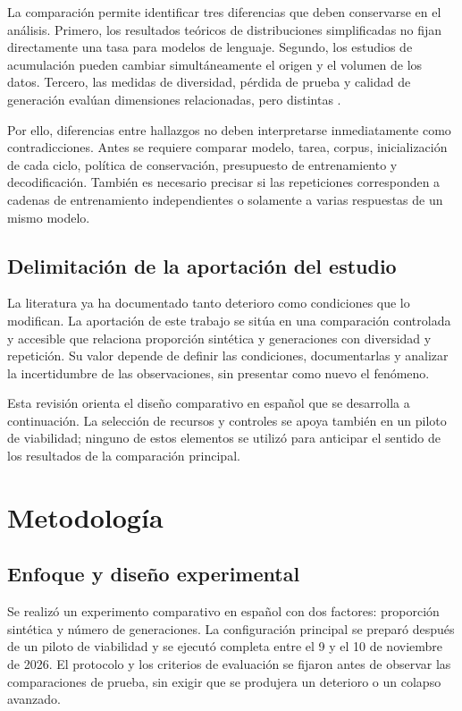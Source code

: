 \documentclass[12pt,letterpaper]{article}
\begin{document}
La comparación permite identificar tres diferencias que deben conservarse
en el análisis. Primero, los resultados teóricos de distribuciones
simplificadas no fijan directamente una tasa para modelos de lenguaje.
Segundo, los estudios de acumulación pueden cambiar simultáneamente el
origen y el volumen de los datos. Tercero, las medidas de diversidad,
pérdida de prueba y calidad de generación evalúan dimensiones relacionadas,
pero distintas \cite{suresh2025,kazdan2025,guo2024,drayson2025}.

Por ello, diferencias entre hallazgos no deben interpretarse inmediatamente
como contradicciones. Antes se requiere comparar modelo, tarea, corpus,
inicialización de cada ciclo, política de conservación, presupuesto de
entrenamiento y decodificación. También es necesario precisar si las
repeticiones corresponden a cadenas de entrenamiento independientes o
solamente a varias respuestas de un mismo modelo.

\subsection{Delimitación de la aportación del estudio}

La literatura ya ha documentado tanto deterioro como condiciones que lo
modifican. La aportación de este trabajo se sitúa en una comparación
controlada y accesible que relaciona proporción sintética y generaciones
con diversidad y repetición. Su valor depende de definir las condiciones,
documentarlas y analizar la incertidumbre de las observaciones, sin
presentar como nuevo el fenómeno.

Esta revisión orienta el diseño comparativo en español que se desarrolla
a continuación. La selección de recursos y controles se apoya también en
un piloto de viabilidad; ninguno de estos elementos se utilizó para
anticipar el sentido de los resultados de la comparación principal.

\section{Metodología}

\subsection{Enfoque y diseño experimental}

Se realizó un experimento comparativo en español con dos factores:
proporción sintética y número de generaciones. La configuración principal
se preparó después de un piloto de viabilidad y se ejecutó completa entre
el 9 y el 10 de noviembre de 2026. El protocolo y los criterios de
evaluación se fijaron antes de observar las comparaciones de prueba, sin
exigir que se produjera un deterioro o un colapso avanzado.
\end{document}
